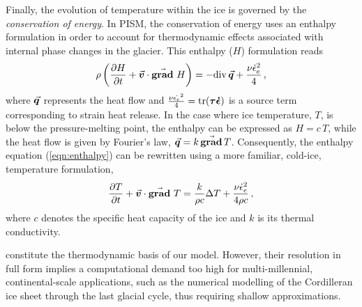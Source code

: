 \documentclass{article}
\newcommand{\vect}[1]{\va*{#1}} %
\newcommand{\tens}[1]{\vb*{#1}} %
\renewcommand{\div}[1]{\mathrm{div}\,#1}            %
\renewcommand{\grad}[1]{\vect{\mathrm{grad}}\,#1}   %
\newcommand{\matdv}[1]{\pdv{#1}{t}+\vect{v}\cdot\grad{}\,#1}  %
\newcommand{\doteps}[0]{\dot{\epsilon}} %
\newcommand{\DST}[0]{\tens{\tau}}       %
\newcommand{\SRT}[0]{\tens{\doteps}}    %
\begin{document}
Finally, the evolution of temperature within the ice is governed by the
\emph{conservation of energy}. In PISM, the conservation of energy uses an
enthalpy formulation in order to account for thermodynamic effects associated
with internal phase changes in the glacier. This enthalpy ($H$) formulation
reads
\begin{equation}
    \label{eqn:enthalpy}
    \rho \left(\matdv{H}\right)
        = -\div{\vect{q}} + \frac{\nu\doteps_e^2}{4} \,,
\end{equation}
where $\vect{q}$ represents the heat flow and
${\frac{\nu\dot{\epsilon_e}^2}{4} = \tr(\DST\SRT)}$ is a
source term corresponding to strain heat release. In the case where ice
temperature, $T$, is below the pressure-melting point, the enthalpy can be
expressed as $H=c\,T$, while the heat flow is given by Fourier's law,
$\vect{q} = k\,\grad{T}$. Consequently, the enthalpy equation
(\ref{eqn:enthalpy}) can be rewritten using a more familiar, cold-ice,
temperature formulation,
\begin{equation}
    \label{eqn:temperature}
    \matdv{T} = \frac{k}{\rho c} \Delta T
                + \frac{\nu\doteps_e^2}{4\rho c} \,,
\end{equation}
where $c$ denotes the specific heat capacity of the ice and $k$ is its thermal
conductivity.

constitute the thermodynamic basis
of our model. However, their resolution in full form implies a computational
demand too high for multi-millennial, continental-scale applications, such as
the numerical modelling of the Cordilleran ice sheet through the last glacial
cycle, thus requiring shallow approximations.
\end{document}
